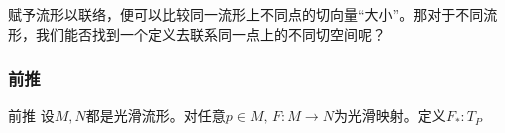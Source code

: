 赋予流形以联络，便可以比较同一流形上不同点的切向量“大小”。那对于不同流形，我们能否找到一个定义去联系同一点上的不同切空间呢？

\subsubsection{前推}
\begin{definition}{前推}
设$M,N$都是光滑流形。对任意$p\in M,\,F:M\rightarrow N$为光滑映射。定义$F_*:T_P$
\end{definition}